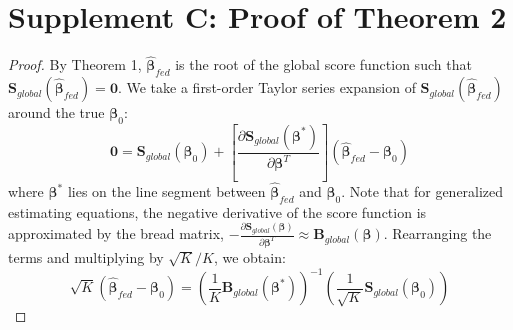 \documentclass[useAMS,referee, usegraphicx]{biom}
\begin{document}
\section{Supplement C: Proof of Theorem 2}
\begin{proof}
By Theorem  1, $\hat{\boldsymbol{\beta}}_{fed}$ is the root of the global score function such that $\mathbf{S}_{global}(\hat{\boldsymbol{\beta}}_{fed}) = \mathbf{0}$. We take a first-order Taylor series expansion of $\mathbf{S}_{global}(\hat{\boldsymbol{\beta}}_{fed})$ around the true $\boldsymbol{\beta}_0$:
\begin{equation}
    \mathbf{0} = \mathbf{S}_{global}\left(\boldsymbol{\beta}_0\right) + \left[ \frac{\partial \mathbf{S}_{global}\left(\boldsymbol{\beta}^*\right)}{\partial \boldsymbol{\beta}^T} \right] \left(\hat{\boldsymbol{\beta}}_{fed} - \boldsymbol{\beta}_0\right)
\end{equation}
where $\boldsymbol{\beta}^*$ lies on the line segment between $\hat{\boldsymbol{\beta}}_{fed}$ and $\boldsymbol{\beta}_0$. Note that for generalized estimating equations, the negative derivative of the score function is approximated by the bread matrix, $-\frac{\partial \mathbf{S}_{global}(\boldsymbol{\beta})}{\partial \boldsymbol{\beta}^T} \approx \mathbf{B}_{global}(\boldsymbol{\beta})$. Rearranging the terms and multiplying by $\sqrt{K} / K$, we obtain:
\begin{equation}
    \sqrt{K}\left(\hat{\boldsymbol{\beta}}_{fed} - \boldsymbol{\beta}_0\right) = \left( \frac{1}{K} \mathbf{B}_{global}(\boldsymbol{\beta}^*) \right)^{-1} \left( \frac{1}{\sqrt{K}} \mathbf{S}_{global}(\boldsymbol{\beta}_0) \right)
\end{equation}


\end{proof}
\end{document}
